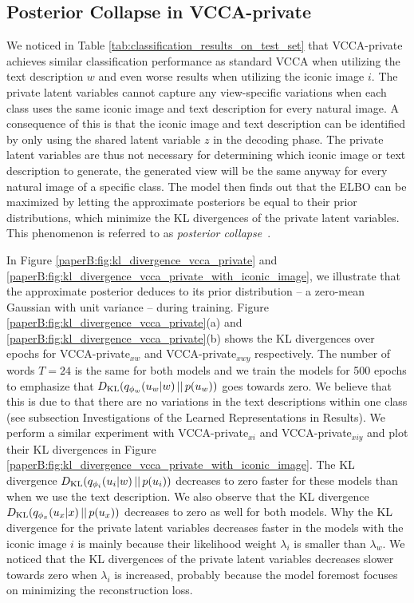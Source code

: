 \subsection{Posterior Collapse in VCCA-private}
\label{paperB:app:posterior_collapse_in_vcca_private}

We noticed in Table \ref{tab:classification_results_on_test_set} %
that VCCA-private achieves similar classification performance as standard VCCA when utilizing the text description $w$ and even worse results when utilizing the iconic image $i$. The private latent variables cannot capture any view-specific variations when each class uses the same iconic image and text description for every natural image. 
A consequence of this is that the iconic image and text description can be identified by only using the shared latent variable $z$ in the decoding phase. The private latent variables are thus not necessary for determining which iconic image or text description to generate, the generated view will be the same anyway for every natural image of a specific class. The model then finds out that the ELBO can be maximized by letting the approximate posteriors be equal to their prior distributions, which minimize the KL divergences of the private latent variables. This phenomenon is referred to as \textit{posterior collapse}~. 

In Figure \ref{paperB:fig:kl_divergence_vcca_private} and \ref{paperB:fig:kl_divergence_vcca_private_with_iconic_image}, we illustrate that the approximate posterior deduces to its prior distribution -- a zero-mean Gaussian with unit variance -- during training. Figure \ref{paperB:fig:kl_divergence_vcca_private}(a) and \ref{paperB:fig:kl_divergence_vcca_private}(b) shows the KL divergences over epochs for VCCA-private$_{x w}$ and VCCA-private$_{x w y}$ respectively. The number of words $T=24$ is the same for both models and we train the models for 500 epochs to emphasize that $D_{\mathrm{KL}}(q_{\phi_{w}}(u_{w} |w)\,||\,p(u_{w}))$ goes towards zero. We believe that this is due to that there are no variations in the text descriptions within one class (see subsection Investigations of the Learned Representations in Results). We perform a similar experiment with VCCA-private$_{x i}$ and VCCA-private$_{x i y}$ and plot their KL divergences in Figure \ref{paperB:fig:kl_divergence_vcca_private_with_iconic_image}. The KL divergence $D_{\mathrm{KL}}(q_{\phi_{i}}(u_{i} |w)\,||\,p(u_{i}))$ decreases to zero faster for these models than when we use the text description. We also observe that the KL divergence $D_{\mathrm{KL}}(q_{\phi_{x}}(u_{x} |x)\,||\,p(u_{x}))$ decreases to zero as well for both models. Why the KL divergence for the private latent variables decreases faster in the models with the iconic image $i$ is mainly because their likelihood weight $\lambda_{i}$ is smaller than $\lambda_{w}$. We noticed that the KL divergences of the private latent variables decreases slower towards zero when $\lambda_{i}$ is increased, probably because the model foremost focuses on minimizing the reconstruction loss. 

